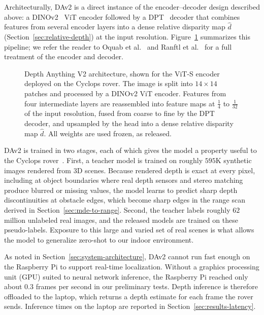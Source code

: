 Architecturally, DAv2 is a direct instance of the encoder--decoder design described above: a
DINOv2~\cite{DINOv2} ViT encoder followed by a DPT~\cite{DPT} decoder that combines features from
several encoder layers into a dense relative disparity map $\hat{d}$
(Section~\ref{sec:relative-depth}) at the input resolution. Figure~\ref{fig:dav2-architecture}
summarizes this pipeline; we refer the reader to Oquab et al.~\cite{DINOv2} and Ranftl
et al.~\cite{DPT} for a full treatment of the encoder and decoder.

\begin{figure}[htbp]
  \centering
  
  \caption[Depth Anything V2 architecture]{Depth Anything V2 architecture, shown for the ViT-S
    encoder deployed on the Cyclops rover. The image is split into $14 \times 14$ patches and
    processed by a DINOv2 ViT encoder. Features from four intermediate layers are reassembled
    into feature maps at $\tfrac{1}{4}$ to $\tfrac{1}{32}$ of the input resolution, fused from
    coarse to fine by the DPT decoder, and upsampled by the head into a dense relative disparity
    map $\hat{d}$. All weights are used frozen, as released.}
  \label{fig:dav2-architecture}
\end{figure}

DAv2 is trained in two stages, each of which gives the model a property useful to the Cyclops
rover~\cite{DepthAnythingV2}. First, a teacher model is trained on roughly $595$K synthetic
images rendered from 3D scenes. Because rendered depth is exact at every pixel, including at
object boundaries where real depth sensors and stereo matching produce blurred or missing
values, the model learns to predict sharp depth discontinuities at obstacle edges, which become
sharp edges in the range scan derived in Section~\ref{sec:mde-to-range}. Second, the teacher
labels roughly $62$ million unlabeled real images, and the released models are trained on these
pseudo-labels. Exposure to this large and varied set of real scenes is what allows the model to
generalize zero-shot to our indoor environment.

As noted in Section~\ref{sec:system-architecture}, DAv2 cannot run fast enough on the Raspberry Pi
to support real-time localization. Without a graphics processing unit (GPU) suited to neural
network inference, the Raspberry Pi reached only about $0.3$ frames per second in our preliminary
tests. Depth inference is therefore offloaded to the laptop, which returns a depth estimate for
each frame the rover sends. Inference times on the laptop are reported in
Section~\ref{sec:results-latency}.

